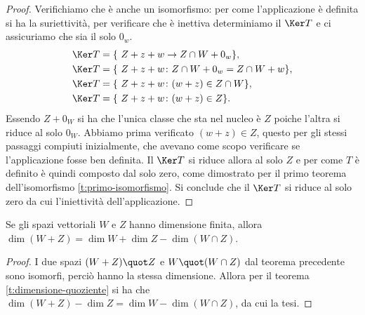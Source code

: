 \begin{proof}
	Verifichiamo che è anche un isomorfismo: per come l'applicazione è definita si ha la suriettività, per verificare che è inettiva determiniamo il $\Ker T$ e ci assicuriamo che sia il solo $0_w$.
	\begin{align*}
		\Ker T&=\{\ Z +   z +   w\to Z\cap W + 0_w  \},\\
		\Ker T&=\{\ Z +   z +   w\colon Z\cap W + 0_w = Z\cap W +   w \},\\
		\Ker T&=\{\ Z +   z +   w\colon (  w +   z)\in Z\cap W \},\\
		\Ker T&=\{\ Z +   z +   w\colon (  w +  z)\in Z \}.
	\end{align*}
	Essendo $Z + 0_W$ si ha che l'unica classe che sta nel nucleo è $Z$ poiche l'altra si riduce al solo $0_W$.
	Abbiamo prima verificato $(  w +  z)\in Z$, questo per gli stessi passaggi compiuti inizialmente, che avevano come scopo verificare se l'applicazione fosse ben definita.
	Il $\Ker T$ si riduce allora al solo $Z$ e per come $T$ è definito è quindi composto dal solo zero, come dimostrato per il primo teorema dell'isomorfismo \ref{t:primo-isomorfismo}.
	Si conclude che il $\Ker T$ si riduce al solo zero da cui l'iniettività dell'applicazione. 
\end{proof}
\begin{corollario}
	Se gli spazi vettoriali $W$ e $Z$ hanno dimensione finita, allora $\dim(W+Z)=\dim W+\dim Z-\dim(W\cap Z)$.
\end{corollario}
\begin{proof}
	I due spazi $(W+Z)\quot Z$ e $W\quot(W\cap Z)$ dal teorema precedente sono isomorfi, perciò hanno la stessa dimensione.
	Allora per il teorema \ref{t:dimensione-quoziente} si ha che $\dim(W+Z)-\dim Z=\dim W-\dim(W\cap Z)$, da cui la tesi.
\end{proof}

